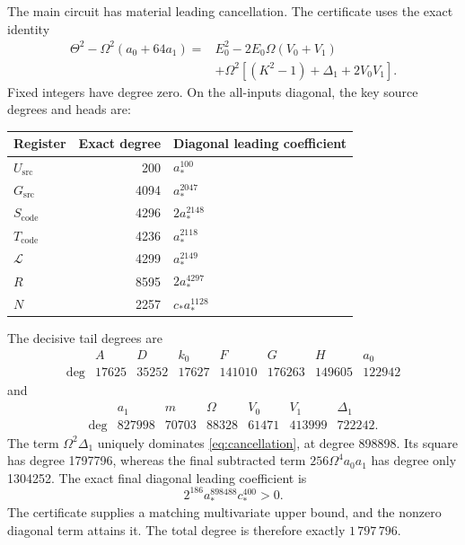 \documentclass[11pt,a4paper]{article}
\theoremstyle{remark}
\newcommand{\Sc}{S_{\mathrm{code}}}
\newcommand{\Tc}{T_{\mathrm{code}}}
\newcommand{\Gs}{G_{\mathrm{src}}}
\newcommand{\Us}{U_{\mathrm{src}}}
\begin{document}
The main circuit has material leading cancellation. The certificate
uses the exact identity
\begin{equation}
\begin{split}
 \Theta^2-\Omega^2(a_0+64a_1)
 ={}&E_0^2-2E_0\Omega(V_0+V_1)\\
  &+\Omega^2[(K^2-1)+\Delta_1+2V_0V_1].
\end{split}
\label{eq:cancellation}
\end{equation}
Fixed integers have degree zero. On the all-inputs diagonal, the
key source degrees and heads are:
\begin{center}
\begin{tabular}{@{}lrl@{}}
\toprule
Register & Exact degree & Diagonal leading coefficient\\
\midrule
\(\Us\) & 200 & \(a_\ast^{100}\)\\
\(\Gs\) & 4094 & \(a_\ast^{2047}\)\\
\(\Sc\) & 4296 & \(2a_\ast^{2148}\)\\
\(\Tc\) & 4236 & \(a_\ast^{2118}\)\\
\(\mathcal L\) & 4299 & \(a_\ast^{2149}\)\\
\(R\) & 8595 & \(2a_\ast^{4297}\)\\
\(N\) & 2257 & \(c_\ast a_\ast^{1128}\)\\
\bottomrule
\end{tabular}
\end{center}
The decisive tail degrees are
\[
\begin{array}{c|rrrrrrr}
 &A&D&k_0&F&G&H&a_0\\ \hline
 \deg&17625&35252&17627&141010&176263&149605&122942
\end{array}
\]
and
\[
\begin{array}{c|rrrrrr}
 &a_1&m&\Omega&V_0&V_1&\Delta_1\\ \hline
 \deg&827998&70703&88328&61471&413999&722242.
\end{array}
\]
The term \(\Omega^2\Delta_1\) uniquely dominates
\eqref{eq:cancellation}, at degree 898898. Its square has degree
1797796, whereas the final subtracted term
\(256\Omega^4a_0a_1\) has degree only 1304252.
The exact final diagonal leading coefficient is
\begin{equation}
 \boxed{2^{186}a_\ast^{898488}c_\ast^{400}>0.}
\label{eq:head}
\end{equation}
The certificate supplies a matching multivariate upper bound, and
the nonzero diagonal term attains it. The total degree is therefore
exactly \(1\,797\,796\).
\end{document}
